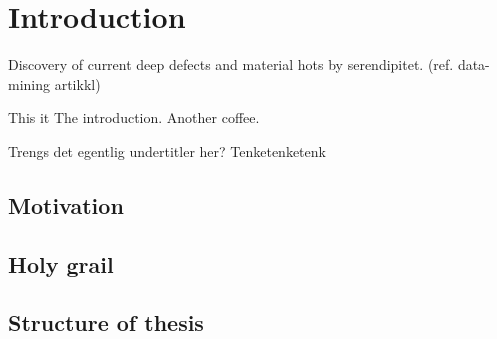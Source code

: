 \chapter{Introduction}

Discovery of current deep defects and material hots by serendipitet. (ref. data-mining artikkl)

This it The introduction.
Another coffee.

Trengs det egentlig undertitler her? Tenketenketenk
\newpage
\section{Motivation}
\section{Holy grail}
\section{Structure of thesis}
